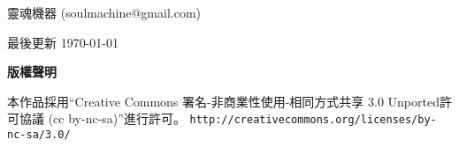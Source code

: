 \thispagestyle{plain}
\begin{center}
  {\LARGE\textbf{\BookTitle}}

  \vspace{1em}
  {\large 靈魂機器 (soulmachine@gmail.com)}

  \vspace{1ex}
  
  \vspace{1ex}
  最後更新 \today
  
  \vspace{1em}
  \textbf{\large 版權聲明}
\end{center}
\noindent 本作品採用“Creative Commons 署名-非商業性使用-相同方式共享 3.0 Unported許可協議 
(cc by-nc-sa)”進行許可。
\texttt{\small http://creativecommons.org/licenses/by-nc-sa/3.0/}

\vspace{1em}
